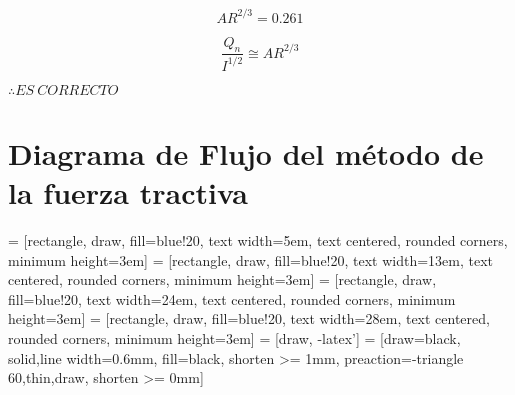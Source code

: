 \documentclass[10.5pt]{article}
\begin{document}
\begin{equation*}
  A R^{2/3} = 0.261
\end{equation*}

\begin{equation*}
  \dfrac{Q_{n}}{I^{1/2}} \cong A R^{2/3}
\end{equation*}

$\therefore ES\ CORRECTO$


\section*{Diagrama de Flujo del método de la fuerza tractiva}


 = [rectangle, draw, fill=blue!20, text width=5em, text centered, rounded corners, minimum height=3em]
 = [rectangle, draw, fill=blue!20, text width=13em, text centered, rounded corners, minimum height=3em]
 = [rectangle, draw, fill=blue!20, text width=24em, text centered, rounded corners, minimum height=3em]
 = [rectangle, draw, fill=blue!20, text width=28em, text centered, rounded corners, minimum height=3em]
 = [draw, -latex']
 = [draw=black, solid,line width=0.6mm, fill=black, shorten >= 1mm, preaction={-triangle 60,thin,draw, shorten >= 0mm}] 
\end{document}
